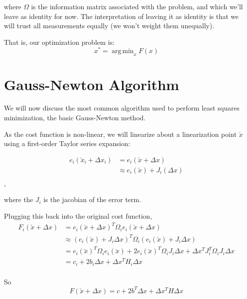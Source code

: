 \documentclass[twoside]{article}
\DeclareMathOperator*{\argmin}{arg\,min}
\begin{document}
where $\Omega$ is the information matrix associated with the problem, and which we'll leave as identity for now. The interpretation of leaving it as identity is that we will trust all measurements equally (we won't weight them unequally).

That is, our optimization problem is:
\begin{equation}
x^* = \argmin_x F(x)
\end{equation}

\section{Gauss-Newton Algorithm}

We will now discuss the most common algorithm used to perform least squares minimization, the basic Gauss-Newton method.

As the cost function is non-linear, we will linearize about a linearization point $\breve{x}$ using a first-order Taylor series expansion:

\begin{equation}
\begin{split}
e_i(\breve{x}_i + \Delta x_i) &= e_i(\breve{x} + \Delta x)\\
&\approx e_i(\breve{x}) + J_i(\Delta x)\\
\end{split}
\end{equation},

where the $J_i$ is the jacobian of the error term.

Plugging this back into the original cost function,
\begin{equation}
\begin{split}
F_i(\breve{x} + \Delta{x}) &= e_i(\breve{x} + \Delta x)^T \Omega_i e_i(\breve{x} + \Delta x) \\
&\approx (e_i(\breve{x}) + J_i \Delta x)^T \Omega_i (e_i(\breve{x}) + J_i \Delta x) \\
&= e_i(\breve{x})^T \Omega_i e_i(\breve{x}) + 2e_i(\breve{x})^T \Omega_i J_i \Delta x + \Delta x^T J_i^T \Omega_i J_i \Delta x \\
&= c_i + 2b_i \Delta x + \Delta x^T H_i \Delta x \\
\end{split}
\end{equation}

So
\begin{equation}
F(\breve{x} + \Delta{x}) = c + 2b^T \Delta x + \Delta x^T H \Delta x 
\end{equation}
\end{document}

